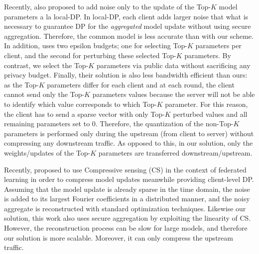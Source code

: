 \documentclass[accepted]{uai2021} %
\newcommand{\TOPK}{Top-$K$\xspace}
\begin{document}
Recently, \cite{Liu_2020} also proposed to add noise only to the update of the \TOPK model parameters a la local-DP. In local-DP, each client adds larger noise that what is necessary to guarantee DP for the \emph{aggregated} model update without using secure aggregation. Therefore, the common model is less accurate than with our scheme. In addition,  \cite{Liu_2020} uses two epsilon budgets; one for selecting \TOPK parameters per client, and the second for perturbing these selected \TOPK parameters. By contrast, we select the \TOPK parameters via public data without sacrificing any privacy budget. Finally, their solution is also less bandwidth efficient than ours: as the \TOPK parameters differ for each client and at each round, the client cannot send only the \TOPK parameters values because the server will not be able to identify which value corresponds to which \TOPK parameter. For this reason, the client has to send a sparse vector with only \TOPK perturbed values and all remaining parameters set to 0. Therefore, the quantization of the non-\TOPK parameters is performed only during the upstream (from client to server) without compressing any downstream traffic. As opposed to this, in our solution, only the weights/updates of the \TOPK parameters are transferred downstream/upstream.

Recently, \cite{our_cs} proposed to use Compressive sensing (CS) in the context of federated learning in order to compress model updates meanwhile providing  client-level DP. Assuming that the model update is already sparse in the time domain, the noise is added to its largest Fourier coefficients in a distributed manner, and the noisy aggregate is reconstructed with standard optimization techniques. 
Likewise our solution, this work also uses secure aggregation by exploiting the linearity of CS. However, the reconstruction process can be slow for large models, and therefore our solution is more scalable. Moreover, it can only compress the upstream traffic.

\smallskip
\end{document}
